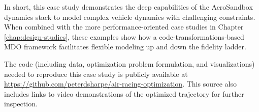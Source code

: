 In short, this case study demonstrates the deep capabilities of the AeroSandbox dynamics stack to model complex vehicle dynamics with challenging constraints. When combined with the more performance-oriented case studies in Chapter \ref{chap:design-studies}, these examples show how a code-transformations-based MDO framework facilitates flexible modeling up and down the fidelity ladder.

The code (including data, optimization problem formulation, and visualizations) needed to reproduce this case study is publicly available at \url{https://github.com/peterdsharpe/air-racing-optimization}. This source also includes links to video demonstrations of the optimized trajectory for further inspection.


